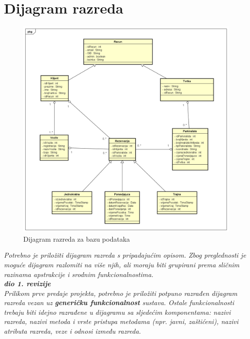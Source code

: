 			\eject
			
			
		\section{Dijagram razreda}
		
		\begin{figure}[H]
	        \includegraphics[width=1\linewidth]{dijagrami/Class Diagram0.PNG} %
        	\caption{Dijagram razreda za bazu podataka}
        	\label{fig:promjene2} %
        \end{figure}
		
			\textit{Potrebno je priložiti dijagram razreda s pripadajućim opisom. Zbog preglednosti je moguće dijagram razlomiti na više njih, ali moraju biti grupirani prema sličnim razinama apstrakcije i srodnim funkcionalnostima.}\\
			
			\textbf{\textit{dio 1. revizije}}\\
			
			\textit{Prilikom prve predaje projekta, potrebno je priložiti potpuno razrađen dijagram razreda vezan uz \textbf{generičku funkcionalnost} sustava. Ostale funkcionalnosti trebaju biti idejno razrađene u dijagramu sa sljedećim komponentama: nazivi razreda, nazivi metoda i vrste pristupa metodama (npr. javni, zaštićeni), nazivi atributa razreda, veze i odnosi između razreda.}\\
			
